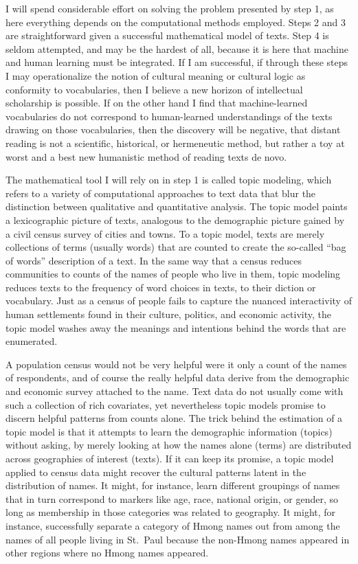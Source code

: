 \documentclass[]{book}
\theoremstyle{definition}
\theoremstyle{definition}
\theoremstyle{definition}
\theoremstyle{remark}
\begin{document}
I will spend considerable effort on solving the problem presented by
step 1, as here everything depends on the computational methods
employed. Steps 2 and 3 are straightforward given a successful
mathematical model of texts. Step 4 is seldom attempted, and may be the
hardest of all, because it is here that machine and human learning must
be integrated. If I am successful, if through these steps I may
operationalize the notion of cultural meaning or cultural logic as
conformity to vocabularies, then I believe a new horizon of intellectual
scholarship is possible. If on the other hand I find that
machine-learned vocabularies do not correspond to human-learned
understandings of the texts drawing on those vocabularies, then the
discovery will be negative, that distant reading is not a scientific,
historical, or hermeneutic method, but rather a toy at worst and a best
new humanistic method of reading texts de novo.

The mathematical tool I will rely on in step 1 is called topic modeling,
which refers to a variety of computational approaches to text data that
blur the distinction between qualitative and quantitative analysis. The
topic model paints a lexicographic picture of texts, analogous to the
demographic picture gained by a civil census survey of cities and towns.
To a topic model, texts are merely collections of terms (usually words)
that are counted to create the so-called ``bag of words'' description of
a text. In the same way that a census reduces communities to counts of
the names of people who live in them, topic modeling reduces texts to
the frequency of word choices in texts, to their diction or vocabulary.
Just as a census of people fails to capture the nuanced interactivity of
human settlements found in their culture, politics, and economic
activity, the topic model washes away the meanings and intentions behind
the words that are enumerated.

A population census would not be very helpful were it only a count of
the names of respondents, and of course the really helpful data derive
from the demographic and economic survey attached to the name. Text data
do not usually come with such a collection of rich covariates, yet
nevertheless topic models promise to discern helpful patterns from
counts alone. The trick behind the estimation of a topic model is that
it attempts to learn the demographic information (topics) without
asking, by merely looking at how the names alone (terms) are distributed
across geographies of interest (texts). If it can keep its promise, a
topic model applied to census data might recover the cultural patterns
latent in the distribution of names. It might, for instance, learn
different groupings of names that in turn correspond to markers like
age, race, national origin, or gender, so long as membership in those
categories was related to geography. It might, for instance,
successfully separate a category of Hmong names out from among the names
of all people living in St.~Paul because the non-Hmong names appeared in
other regions where no Hmong names appeared.
\end{document}
